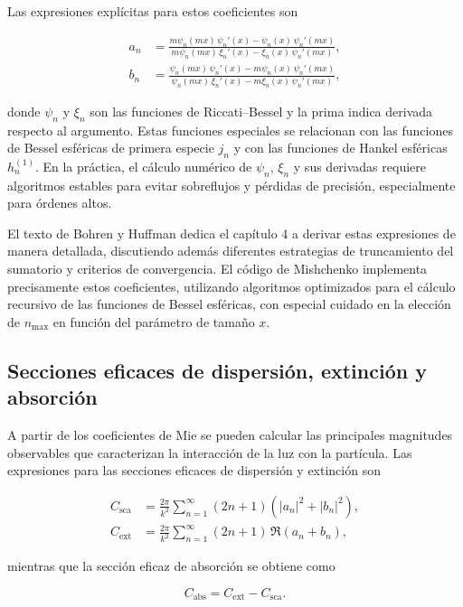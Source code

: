 \documentclass[12pt,a4paper]{article}
\begin{document}
Las expresiones explícitas para estos coeficientes son

\begin{align}
  a_n &= \frac{ m \psi_n(m x)\,\psi_n'(x) - \psi_n(x)\,\psi_n'(m x) }
              { m \psi_n(m x)\,\xi_n'(x) - \xi_n(x)\,\psi_n'(m x) }, \\[4pt]
  b_n &= \frac{ \psi_n(m x)\,\psi_n'(x) - m \psi_n(x)\,\psi_n'(m x) }
              { \psi_n(m x)\,\xi_n'(x) - m \xi_n(x)\,\psi_n'(m x) },
\end{align}

donde $\psi_n$ y $\xi_n$ son las funciones de Riccati--Bessel y la prima indica derivada respecto al argumento.
Estas funciones especiales se relacionan con las funciones de Bessel esféricas de primera especie $j_n$ y con las funciones de Hankel esféricas $h_n^{(1)}$.
En la práctica, el cálculo numérico de $\psi_n$, $\xi_n$ y sus derivadas requiere algoritmos estables para evitar sobreflujos y pérdidas de precisión, especialmente para órdenes altos.

El texto de Bohren y Huffman dedica el capítulo 4 a derivar estas expresiones de manera detallada, discutiendo además diferentes estrategias de truncamiento del sumatorio y criterios
de convergencia.
El código de Mishchenko implementa precisamente estos coeficientes, utilizando algoritmos optimizados para el cálculo recursivo de las funciones de Bessel esféricas, con especial cuidado
en la elección de $n_{\text{max}}$ en función del parámetro de tamaño $x$.

\subsection{Secciones eficaces de dispersión, extinción y absorción}

A partir de los coeficientes de Mie se pueden calcular las principales magnitudes observables que caracterizan la interacción de la luz con la partícula.
Las expresiones para las secciones eficaces de dispersión y extinción son

\begin{align}
  C_{\text{sca}} &= \frac{2\pi}{k^2} \sum_{n=1}^{\infty} (2n+1) \left( |a_n|^2 + |b_n|^2 \right), \\[4pt]
  C_{\text{ext}} &= \frac{2\pi}{k^2} \sum_{n=1}^{\infty} (2n+1) \,\Re(a_n + b_n),
\end{align}

mientras que la sección eficaz de absorción se obtiene como

\begin{equation}
  C_{\text{abs}} = C_{\text{ext}} - C_{\text{sca}}.
\end{equation}
\end{document}
